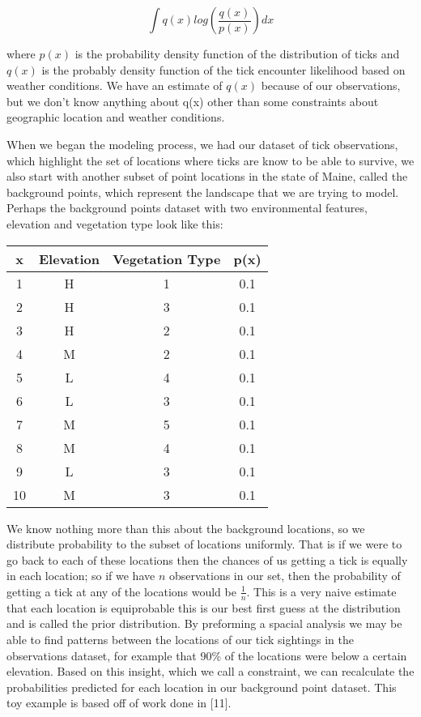 \begin{equation}
\int q(x)log(\frac{q(x)}{p(x)}) dx
\end{equation}

\noindent where $p(x)$ is the probability density function of the distribution of ticks and $q(x)$ is the probably density function of the tick encounter likelihood based on weather conditions. We have an estimate of $q(x)$ because of our observations, but we don't know anything about q(x) other than some constraints about geographic location and weather conditions.\newline

\noindent When we began the modeling process, we had our dataset of tick observations, which highlight the set of locations where ticks are know to be able to survive, we also start with another subset of point locations in the state of Maine, called the background points, which represent the landscape that we are trying to model. Perhaps the background points dataset with two environmental features, elevation and vegetation type look like this: 

\begin{center}
 \begin{tabular}{||c c c c||} 
 \hline
 x & Elevation & Vegetation Type & p(x) \\ [0.5ex] 
 \hline\hline
 1 & H &  1& 0.1  \\ 
 \hline
  2 & H & 3 & 0.1\\
 \hline
   3 & H & 2 & 0.1\\
 \hline
 4 & M & 2 & 0.1  \\
 \hline
  5 & L & 4 & 0.1 \\
 \hline
   6 & L & 3 & 0.1\\
 \hline
  7 & M & 5 & 0.1 \\
 \hline
   8 & M & 4 & 0.1\\
 \hline
 9 & L & 3 & 0.1 \\
 \hline
   10 & M & 3 & 0.1\\
 \hline
\end{tabular}
\end{center}




\noindent We know nothing more than this about the background locations, so we distribute probability to the subset of locations uniformly. That is if we were to go back to each of these locations then the chances of us getting a tick is equally in each location; so if we have $n$ observations in our set, then the probability of getting a tick at any of the locations would be $\frac{1}{n}$. This is a very naive estimate that each location is equiprobable this is our best first guess at the distribution and is called the prior distribution. By preforming a spacial analysis we may be able to find patterns between the locations of our tick sightings in the observations dataset, for example that 90\% of the locations were below a certain elevation. Based on this insight, which we call a constraint, we can recalculate the probabilities predicted for each location in our background point dataset. This toy example is based off of work done in [11]. \newline

